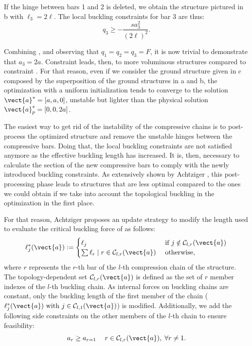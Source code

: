 If the hinge between bars 1 and 2 is deleted, we obtain the structure pictured in b with $\ell_3=2\ell$. The local buckling constraints for bar 3 are thus:
\begin{equation}
    q_3\geq -\frac{s a_3^2}{(2\ell)^2}.
    \label{eq:04_chain_2}
\end{equation}

Combining ,  and observing that $q_1=q_2=q_3=F$, it is now trivial to demonstrate that $a_3=2a$. Constraint  leads, then, to more voluminous structures compared to constraint . For that reason, even if we consider the ground structure given in c composed by the superposition of the ground structures in a and b, the optimization with a uniform initialization tends to converge to the solution $\vect{a}^*=[a,a,0]$, unstable but lighter than the physical solution $\vect{a}_p^*=[0,0,2a]$. 

The easiest way to get rid of the instability of the compressive chains is to post-process the optimized structure and remove the unstable hinges between the compressive bars. Doing that, the local buckling constraints are not satisfied anymore as the effective buckling length has increased. It is, then, necessary to calculate the section of the new compressive bars to comply with the newly introduced buckling constraints. As extensively shown by Achtziger , this post-processing phase leads to structures that are less optimal compared to the ones we could obtain if we take into account the topological buckling in the optimization in the first place.

For that reason, Achtziger proposes an update strategy to modify the length used to evaluate the critical buckling force of  as follows:
\begin{equation}
    \ell^*_j(\vect{a}):= 
    \begin{cases}
        \ell_j & \text { if } j \notin \mathcal{C}_{l,r}(\vect{a}) \\
        \sum \ell_{r} \;|\; r \in \mathcal{C}_{l,r}(\vect{a})  & \text { otherwise,}
    \end{cases}
    \label{eq:04_chain_len}
\end{equation}
where $r$ represents the $r$-th bar of the $l$-th compression chain of the structure. The topology-dependent set $\mathcal{C}_{l,r}(\vect{a})$ is defined as the set of $r$ member indexes of the $l$-th buckling chain. As internal forces on buckling chains are constant, only the buckling length of the first member of the chain ($\ell^*_j(\vect{a}) \text{ with } j \in \mathcal{C}_{l,1}(\vect{a})$) is modified. Additionally, we add the following side constraints on the other members of the $l$-th chain to ensure feasibility:
\begin{equation}
    a_{r}\geq a_{r=1} \quad \; r \in \mathcal{C}_{l,r}(\vect{a}), \; \forall r \neq 1.
    \label{eq:04_side_cons_chain}
\end{equation}

